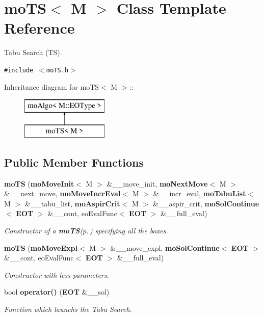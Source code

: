 \section{mo\-TS$<$ M $>$ Class Template Reference}
\label{classmo_t_s}
Tabu Search (TS).  


{\tt \#include $<$mo\-TS.h$>$}

Inheritance diagram for mo\-TS$<$ M $>$::\begin{figure}[H]
\begin{center}
\leavevmode
\includegraphics[height=2cm]{classmo_t_s}
\end{center}
\end{figure}
\subsection*{Public Member Functions}
\begin{CompactItemize}
\item 
{\bf mo\-TS} ({\bf mo\-Move\-Init}$<$ M $>$ \&\_\-\_\-move\_\-init, {\bf mo\-Next\-Move}$<$ M $>$ \&\_\-\_\-next\_\-move, {\bf mo\-Move\-Incr\-Eval}$<$ M $>$ \&\_\-\_\-incr\_\-eval, {\bf mo\-Tabu\-List}$<$ M $>$ \&\_\-\_\-tabu\_\-list, {\bf mo\-Aspir\-Crit}$<$ M $>$ \&\_\-\_\-aspir\_\-crit, {\bf mo\-Sol\-Continue}$<$ {\bf EOT} $>$ \&\_\-\_\-cont, eo\-Eval\-Func$<$ {\bf EOT} $>$ \&\_\-\_\-full\_\-eval)
\begin{CompactList}\small\item\em Constructor of a {\bf mo\-TS}{\rm (p.\,\pageref{classmo_t_s})} specifying all the boxes. \item\end{CompactList}\item 
{\bf mo\-TS} ({\bf mo\-Move\-Expl}$<$ M $>$ \&\_\-\_\-move\_\-expl, {\bf mo\-Sol\-Continue}$<$ {\bf EOT} $>$ \&\_\-\_\-cont, eo\-Eval\-Func$<$ {\bf EOT} $>$ \&\_\-\_\-full\_\-eval)
\begin{CompactList}\small\item\em Constructor with less parameters. \item\end{CompactList}\item 
bool {\bf operator()} ({\bf EOT} \&\_\-\_\-sol)
\begin{CompactList}\small\item\em Function which launchs the Tabu Search. \item\end{CompactList}\end{CompactItemize}

